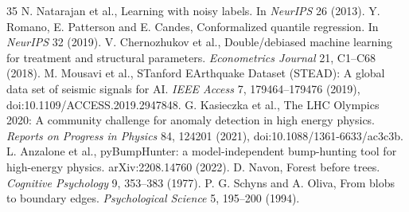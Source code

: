 \documentclass[10pt]{article}
\begin{document}
\begin{thebibliography}{35}
 N. Natarajan et al., Learning with noisy labels. In \emph{NeurIPS} 26 (2013).
 Y. Romano, E. Patterson and E. Candes, Conformalized quantile regression. In \emph{NeurIPS} 32 (2019).
 V. Chernozhukov et al., Double/debiased machine learning for treatment and structural parameters. \emph{Econometrics Journal} 21, C1--C68 (2018).
 M. Mousavi et al., STanford EArthquake Dataset (STEAD): A global data set of seismic signals for AI. \emph{IEEE Access} 7, 179464--179476 (2019), doi:10.1109/ACCESS.2019.2947848.
 G. Kasieczka et al., The LHC Olympics 2020: A community challenge for anomaly detection in high energy physics. \emph{Reports on Progress in Physics} 84, 124201 (2021), doi:10.1088/1361-6633/ac3c3b.
 L. Anzalone et al., pyBumpHunter: a model-independent bump-hunting tool for high-energy physics. arXiv:2208.14760 (2022).
 D. Navon, Forest before trees. \emph{Cognitive Psychology} 9, 353--383 (1977).
 P. G. Schyns and A. Oliva, From blobs to boundary edges. \emph{Psychological Science} 5, 195--200 (1994).
\end{thebibliography}
\end{document}
